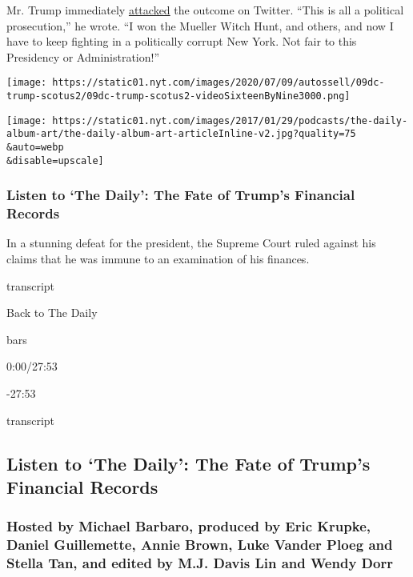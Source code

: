 Mr. Trump immediately
\href{https://twitter.com/realDonaldTrump/status/1281236214646034432}{attacked}
the outcome on Twitter. ``This is all a political prosecution,'' he
wrote. ``I won the Mueller Witch Hunt, and others, and now I have to
keep fighting in a politically corrupt New York. Not fair to this
Presidency or Administration!''

\texttt{[image: https://static01.nyt.com/images/2020/07/09/autossell/09dc-trump-scotus2/09dc-trump-scotus2-videoSixteenByNine3000.png]}

\texttt{[image: https://static01.nyt.com/images/2017/01/29/podcasts/the-daily-album-art/the-daily-album-art-articleInline-v2.jpg?quality=75\\\&auto=webp\\\&disable=upscale]}

\hypertarget{listen-to-the-daily-the-fate-of-trumps-financial-records}{%
\subsubsection{Listen to `The Daily': The Fate of Trump's Financial
Records}\label{listen-to-the-daily-the-fate-of-trumps-financial-records}}

In a stunning defeat for the president, the Supreme Court ruled against
his claims that he was immune to an examination of his finances.

transcript

Back to The Daily

bars

0:00/27:53

-27:53

transcript

\hypertarget{listen-to-the-daily-the-fate-of-trumps-financial-records-1}{%
\subsection{Listen to `The Daily': The Fate of Trump's Financial
Records}\label{listen-to-the-daily-the-fate-of-trumps-financial-records-1}}

\hypertarget{hosted-by-michael-barbaro-produced-by-eric-krupke-daniel-guillemette-annie-brown-luke-vander-ploeg-and-stella-tan-and-edited-by-mj-davis-lin-and-wendy-dorr}{%
\subsubsection{Hosted by Michael Barbaro, produced by Eric Krupke,
Daniel Guillemette, Annie Brown, Luke Vander Ploeg and Stella Tan, and
edited by M.J. Davis Lin and Wendy
Dorr}\label{hosted-by-michael-barbaro-produced-by-eric-krupke-daniel-guillemette-annie-brown-luke-vander-ploeg-and-stella-tan-and-edited-by-mj-davis-lin-and-wendy-dorr}}


